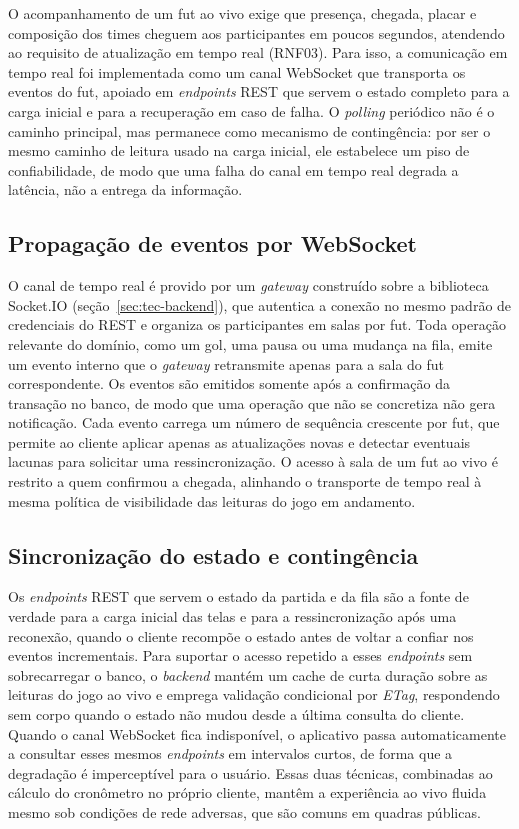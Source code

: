     O acompanhamento de um fut ao vivo exige que presença, chegada, placar e composição dos times cheguem aos participantes em poucos segundos, atendendo ao requisito de atualização em tempo real (RNF03). Para isso, a comunicação em tempo real foi implementada como um canal WebSocket que transporta os eventos do fut, apoiado em \textit{endpoints} REST que servem o estado completo para a carga inicial e para a recuperação em caso de falha. O \textit{polling} periódico não é o caminho principal, mas permanece como mecanismo de contingência: por ser o mesmo caminho de leitura usado na carga inicial, ele estabelece um piso de confiabilidade, de modo que uma falha do canal em tempo real degrada a latência, não a entrega da informação.

    \subsection{Propagação de eventos por WebSocket}
      \label{subsec:dev-websocket}
      O canal de tempo real é provido por um \textit{gateway} construído sobre a biblioteca Socket.IO (seção~\ref{sec:tec-backend}), que autentica a conexão no mesmo padrão de credenciais do REST e organiza os participantes em salas por fut. Toda operação relevante do domínio, como um gol, uma pausa ou uma mudança na fila, emite um evento interno que o \textit{gateway} retransmite apenas para a sala do fut correspondente. Os eventos são emitidos somente após a confirmação da transação no banco, de modo que uma operação que não se concretiza não gera notificação. Cada evento carrega um número de sequência crescente por fut, que permite ao cliente aplicar apenas as atualizações novas e detectar eventuais lacunas para solicitar uma ressincronização. O acesso à sala de um fut ao vivo é restrito a quem confirmou a chegada, alinhando o transporte de tempo real à mesma política de visibilidade das leituras do jogo em andamento.

    \subsection{Sincronização do estado e contingência}
      \label{subsec:dev-sincronizacao}
      Os \textit{endpoints} REST que servem o estado da partida e da fila são a fonte de verdade para a carga inicial das telas e para a ressincronização após uma reconexão, quando o cliente recompõe o estado antes de voltar a confiar nos eventos incrementais. Para suportar o acesso repetido a esses \textit{endpoints} sem sobrecarregar o banco, o \textit{backend} mantém um cache de curta duração sobre as leituras do jogo ao vivo e emprega validação condicional por \textit{ETag}, respondendo sem corpo quando o estado não mudou desde a última consulta do cliente. Quando o canal WebSocket fica indisponível, o aplicativo passa automaticamente a consultar esses mesmos \textit{endpoints} em intervalos curtos, de forma que a degradação é imperceptível para o usuário. Essas duas técnicas, combinadas ao cálculo do cronômetro no próprio cliente, mantêm a experiência ao vivo fluida mesmo sob condições de rede adversas, que são comuns em quadras públicas.

